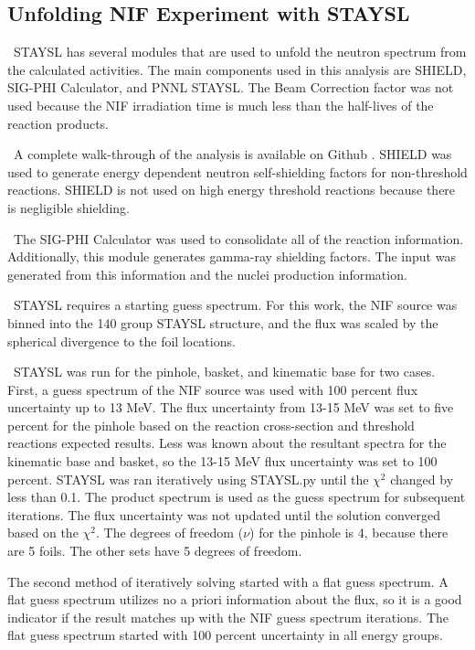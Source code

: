 \documentclass[journal]{IEEEtran}
\begin{document}
	\subsection{Unfolding NIF Experiment with STAYSL}
	\ STAYSL has several modules that are used to unfold the neutron spectrum from the calculated activities. 
The main components used in this analysis are SHIELD, SIG-PHI Calculator, and PNNL STAYSL. 
The Beam Correction factor was not used because the NIF irradiation time is much less than the half-lives of the reaction products. 
	 
	\ A complete walk-through of the analysis is available on Github \cite{Me}. 
SHIELD was used to generate energy dependent neutron self-shielding factors for non-threshold reactions. 
SHIELD is not used on high energy threshold reactions because there is negligible shielding. 
	
	\ The SIG-PHI Calculator was used to consolidate all of the reaction information. Additionally, this module generates gamma-ray shielding factors. 
The input was generated from this information and the nuclei production information. %
	
	\ STAYSL requires a starting guess spectrum. 
For this work, the NIF source was binned into the 140 group STAYSL structure, and the flux was scaled by the spherical divergence to the foil locations. 
	
	\ STAYSL was run for the pinhole, basket, and kinematic base for two cases. 
First, a guess spectrum  of the NIF source %
was used with 100 percent flux uncertainty up to 13 MeV. %
The flux uncertainty from 13-15 MeV was set to five percent for the pinhole based on the reaction cross-section and threshold reactions expected results. %
Less was known about the resultant spectra for the kinematic base and basket, so the 13-15 MeV flux uncertainty was set to 100 percent. 
STAYSL was ran iteratively using STAYSL.py %
until the $\chi^{2}$ changed by less than 0.1. 
The product spectrum is used as the guess spectrum for subsequent iterations. 
The flux uncertainty was not updated until the solution converged based on the $\chi^{2}$.
The degrees of freedom ($\nu$) for the pinhole is 4, because there are 5 foils. The other sets have 5 degrees of freedom.  %
	
	The second method of iteratively solving started with a flat guess spectrum. 
A flat guess spectrum utilizes no a priori information about the flux, so it is a good indicator if the result matches up with the NIF guess spectrum iterations. 
The flat guess spectrum started with 100 percent uncertainty in all energy groups. 
	
\end{document}
